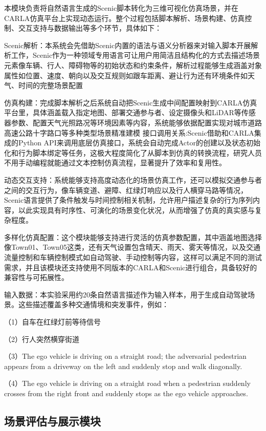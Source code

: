 本模块负责将自然语言生成的Scenic脚本转化为三维可视化仿真场景，并在CARLA仿真平台上实现动态运行。整个过程包括脚本解析、场景构建、仿真控制、交互支持与数据输出等多个环节，具体如下：

	Scenic解析：本系统会先借助Scenic内置的语法与语义分析器来对输入脚本开展解析工作，Scenic作为一种领域专用语言可让用户用简洁且结构化的方式去描述场景元素像车辆、行人、障碍物等的初始状态和约束条件，解析过程能够生成涵盖对象属性如位置、速度、朝向以及交互规则如跟车距离、避让行为还有环境条件如天气、时间的完整场景配置
	
	仿真构建：完成脚本解析之后系统自动把Scenic生成中间配置映射到CARLA仿真平台里，具体涵盖载入指定地图、部署交通参与者、设定摄像头和LiDAR等传感器参数、配置天气光照路况等环境因素等内容，系统能够依据配置实现对城市道路高速公路十字路口等多种类型场景精准建模
	接口调用关系:Scenic借助和CARLA集成的Python API来调用底层仿真接口，系统会自动完成Actor的创建以及状态初始化和行为脚本绑定等任务，这极大程度简化了从脚本到仿真的转换流程，研究人员不用手动编程就能通过文本控制仿真流程，显著提升了效率和复用性。
	
	动态交互支持：系统能够支持高度动态化的场景仿真工作，还可以模拟交通参与者之间的交互行为，像车辆变道、避障、红绿灯响应以及行人横穿马路等情况，Scenic语言提供了条件触发与时间控制相关机制，允许用户描述复杂的行为序列内容，以此实现具有时序性、可演化的场景变化状况，从而增强了仿真的真实感与复杂程度。
	
	多样化仿真配置：这个模块能够支持进行灵活的仿真参数配置，其中涵盖地图选择像Town01、Town05这类，还有天气设置包含晴天、雨天、雾天等情况，以及交通流量控制和车辆控制模式如自动驾驶、手动控制等内容，这样可以满足不同的测试需求，并且该模块还支持使用不同版本的CARLA和Scenic进行组合，具备较好的兼容性与可拓展性。
	

输入数据：本实验采用约20条自然语言描述作为输入样本，用于生成自动驾驶场景。这些描述覆盖多种交通情境和突发事件，例如：

（1）自车在红绿灯前等待信号

（2）行人突然横穿街道

（3）The ego vehicle is driving on a straight road; the adversarial pedestrian appears from a driveway on the left and suddenly stop and walk diagonally.

（4）The ego vehicle is driving on a straight road when a pedestrian suddenly crosses from the right front and suddenly stops as the ego vehicle approaches.

\subsection{场景评估与展示模块}

